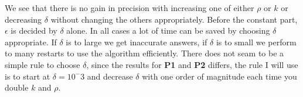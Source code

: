 We see that there is no gain in precision with increasing one of either $\rho$ or $k$ or decreasing $\delta$ without changing the others appropriately. 
Before the constant part, $\epsilon$ is decided by $\delta$ alone. In all cases a lot of time can be saved by choosing $\delta$ appropriate. If $\delta$ is to large we get inaccurate answers, if $\delta$ is to small we perform to many restarts to use the algorithm efficiently. There does not seam to be a simple rule to choose $\delta$, since the results for \textbf{P1} and \textbf{P2} differs, the rule I will use is to start at $\delta=10^-3$ and decrease $\delta$ with one order of magnitude each time you double $k$ and $\rho$. \\